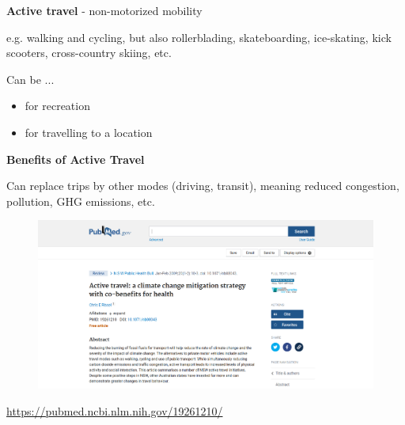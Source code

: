 \documentclass[aspectratio=169]{beamer}
\begin{document}
\begin{frame}
	
	\textbf{Active travel} - non-motorized mobility
	
	\vspace{4mm}
	
	e.g. walking and cycling, but also rollerblading, skateboarding, ice-skating, kick scooters, cross-country skiing, etc.
	
	\vspace{4mm}
	
	Can be ...
	\begin{itemize}
		\item for recreation
		\item for travelling to a location
	\end{itemize}
		
\end{frame}




\begin{frame}
	
	\textbf{Benefits of Active Travel}
	
	\vspace{4mm}
	
	Can replace trips by other modes (driving, transit), meaning reduced congestion, pollution, GHG emissions, etc.
	
	\begin{figure}
		\centering
		\includegraphics[width=0.7\linewidth]{images/active_travel_pollution.png}
	\end{figure}
	
	\tiny\url{https://pubmed.ncbi.nlm.nih.gov/19261210/}

\end{frame}
\end{document}
